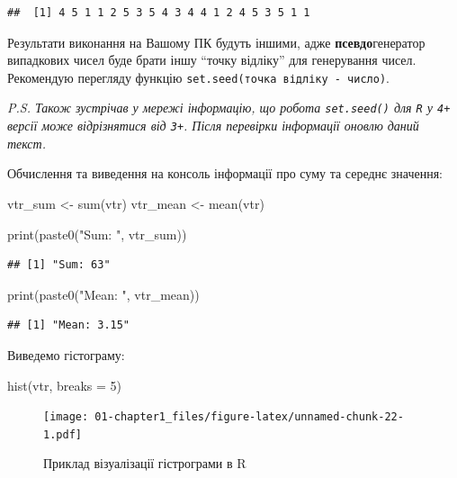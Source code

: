 \documentclass[
]{book}
\newenvironment{Shaded}{\begin{snugshade}}{\end{snugshade}}
\newcommand{\AttributeTok}[1]{\textcolor[rgb]{0.77,0.63,0.00}{#1}}
\newcommand{\DecValTok}[1]{\textcolor[rgb]{0.00,0.00,0.81}{#1}}
\newcommand{\FunctionTok}[1]{\textcolor[rgb]{0.00,0.00,0.00}{#1}}
\newcommand{\NormalTok}[1]{#1}
\newcommand{\OtherTok}[1]{\textcolor[rgb]{0.56,0.35,0.01}{#1}}
\newcommand{\StringTok}[1]{\textcolor[rgb]{0.31,0.60,0.02}{#1}}
\begin{document}
\begin{verbatim}
##  [1] 4 5 1 1 2 5 3 5 4 3 4 4 1 2 4 5 3 5 1 1
\end{verbatim}

Результати виконання на Вашому ПК будуть іншими, адже \textbf{псевдо}генератор випадкових чисел буде брати іншу ``точку відліку'' для генерування чисел. Рекомендую перегляду функцію \texttt{set.seed(точка\ відліку\ -\ число)}.

\emph{P.S. Також зустрічав у мережі інформацію, що робота \texttt{set.seed()} для \texttt{R} у \texttt{4+} версії може відрізнятися від \texttt{3+}. Після перевірки інформації оновлю даний текст.}

Обчислення та виведення на консоль інформації про суму та середнє значення:

\begin{Shaded}
\begin{Highlighting}[]
\NormalTok{vtr\_sum }\OtherTok{\textless{}{-}} \FunctionTok{sum}\NormalTok{(vtr)}
\NormalTok{vtr\_mean }\OtherTok{\textless{}{-}} \FunctionTok{mean}\NormalTok{(vtr)}

\FunctionTok{print}\NormalTok{(}\FunctionTok{paste0}\NormalTok{(}\StringTok{"Sum: "}\NormalTok{, vtr\_sum))}
\end{Highlighting}
\end{Shaded}

\begin{verbatim}
## [1] "Sum: 63"
\end{verbatim}

\begin{Shaded}
\begin{Highlighting}[]
\FunctionTok{print}\NormalTok{(}\FunctionTok{paste0}\NormalTok{(}\StringTok{"Mean: "}\NormalTok{, vtr\_mean))}
\end{Highlighting}
\end{Shaded}

\begin{verbatim}
## [1] "Mean: 3.15"
\end{verbatim}

Виведемо гістограму:

\begin{Shaded}
\begin{Highlighting}[]
\FunctionTok{hist}\NormalTok{(vtr, }\AttributeTok{breaks =} \DecValTok{5}\NormalTok{)}
\end{Highlighting}
\end{Shaded}

\begin{figure}
\centering
\texttt{[image: 01-chapter1\_files/figure-latex/unnamed-chunk-22-1.pdf]}
\caption{\label{fig:unnamed-chunk-22}Приклад візуалізації гістрограми в R}
\end{figure}
\end{document}
